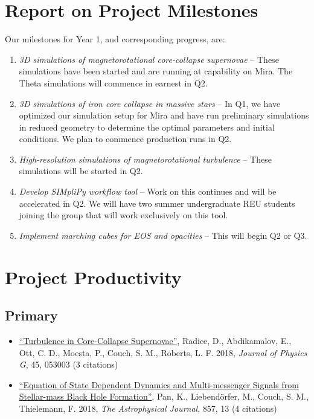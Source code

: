 \documentclass[12pt,titlepage]{article}
\begin{document}
\section{Report on Project Milestones}

Our milestones for Year 1, and corresponding progress, are:
\begin{enumerate}
  \item {\it 3D simulations of magnetorotational core-collapse supernovae} -- These simulations have been started and are running at capability on Mira. The Theta simulations will commence in earnest in Q2.
  \item {\it 3D simulations of iron core collapse in massive stars} -- In Q1, we have optimized our simulation setup for Mira and have run preliminary simulations in reduced geometry to determine the optimal parameters and initial conditions. We plan to commence production runs in Q2.
  \item {\it High-resolution simulations of magnetorotational turbulence} -- These simulations will be started in Q2.
  \item {\it Develop SIMpliPy workflow tool} -- Work on this continues and will be accelerated in Q2. We will have two summer undergraduate REU students joining the group that will work exclusively on this tool.
  \item {\it Implement marching cubes for EOS and opacities} -- This will begin Q2 or Q3.
\end{enumerate}



\section{Project Productivity}

\subsection{Primary}

\begin{itemize}
  \item \href{http://adsabs.harvard.edu/abs/2018JPhG...45e3003R}{``Turbulence in Core-Collapse Supernovae''}, Radice, D., Abdikamalov, E., Ott, C. D., Moesta, P., Couch, S. M., Roberts, L. F. 2018, {\itshape Journal of Physics G}, 45, 053003 (3 citations)
  \item \href{https://ui.adsabs.harvard.edu/#abs/2018ApJ...857...13P/abstract}{``Equation of State Dependent Dynamics and Multi-messenger Signals from Stellar-mass Black Hole Formation''}, Pan, K., Liebend\"orfer, M., Couch, S. M., Thielemann, F. 2018, {\itshape The Astrophysical Journal}, 857, 13 (4 citations)
\end{itemize}
\end{document}
